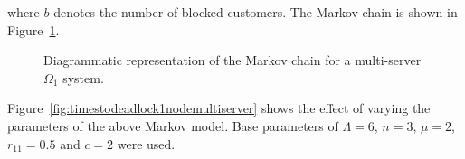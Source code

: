 \documentclass{article}
\numberwithin{equation}{section}
\begin{document}
where $b$ denotes the number of blocked customers.
The Markov chain is shown in Figure~\ref{fig:1nodeMCms}.

\begin{figure}[!htbp]
    \begin{center}
    
    \end{center}
    \caption{Diagrammatic representation of the Markov chain for a multi-server $\Omega_1$ system.}
    \label{fig:1nodeMCms}
\end{figure}

Figure~\ref{fig:timestodeadlock1nodemultiserver} shows the effect of varying the parameters of the above Markov model.
Base parameters of $\Lambda = 6$, $n = 3$, $\mu = 2$, $r_{11} = 0.5$ and $c = 2$ were used.
\end{document}

